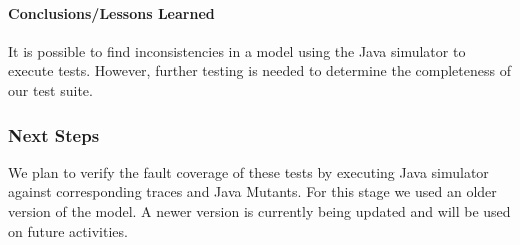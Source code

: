 \documentclass{template/openetcs_article}
\begin{document}
\paragraph{Conclusions/Lessons Learned}
It is possible to find inconsistencies in a model using the Java simulator to execute tests. However, further testing is needed to determine the completeness of our test suite.

\subsubsection{Next Steps}
We plan to verify the fault coverage of these tests by executing Java
simulator against corresponding traces and Java Mutants. For this stage we used an older version of the model. A newer version is currently being updated and will be used on future activities.

\newpage


\let\oldparagraph\paragraph
\let\oldsubparagraph\subparagraph

\renewcommand{\paragraph}[1]{\subsection{#1}}
\renewcommand{\subparagraph}[1]{\subsubsection{#1}}



\newpage



\newpage



\newpage


\let\paragraph\oldparagraph
\let\paragraph\oldsubparagraph
\end{document}
